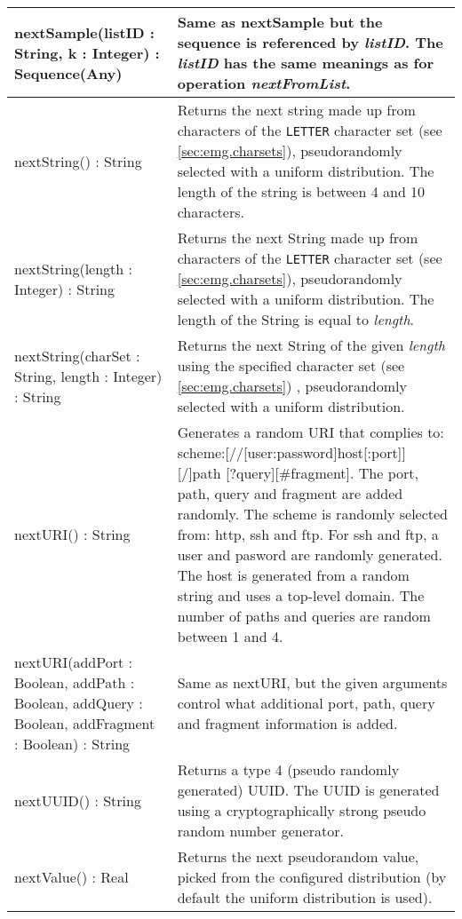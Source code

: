 \begin{longtabu} {|p{6.5cm}|X|}
	nextSample(listID : String, k : Integer) : Sequence(Any) & Same as nextSample but the sequence is referenced by \emph{listID}. The \emph{listID} has the same meanings as for operation \emph{nextFromList}.\\\hline
	
    nextString() : String &  Returns the next string made up from characters of the \texttt{LETTER} character set (see \ref{sec:emg.charsets}), pseudorandomly selected with a uniform distribution. The length of the string is between 4 and 10 characters.\\\hline
    
    nextString(length : Integer) : String &  Returns the next String made up from characters of the \texttt{LETTER} character set (see \ref{sec:emg.charsets}), pseudorandomly selected with a uniform distribution. The length of the String is equal to \emph{length}.\\\hline
    
	nextString(charSet : String, length : Integer) : String &  Returns the next  String of the given \emph{length} using the specified character set (see \ref{sec:emg.charsets}) , pseudorandomly selected with a uniform distribution.\\\hline
	
	nextURI() : String & Generates a random URI that complies to: scheme:[//[user:password\@]host[:port]][/]path [?query][\#fragment]. The port, path, query and fragment are added randomly. The scheme is randomly selected from:  http, ssh and ftp. For ssh and ftp, a user and pasword are randomly generated.  The host is generated from a random string and uses a top-level domain. The number of paths and queries are random between 1 and 4.\\\hline
	
	nextURI(addPort : Boolean, addPath : Boolean, addQuery : Boolean, addFragment : Boolean) : String & Same as nextURI, but the given arguments control what additional port, path, query and fragment information is added.\\\hline
    
    nextUUID() : String & Returns a type 4 (pseudo randomly generated) UUID. The UUID is generated using a cryptographically strong pseudo random number generator.\\\hline
	
	nextValue() : Real & Returns the next pseudorandom value, picked from the configured distribution (by default the uniform distribution is used).\\\hline
    

\end{longtabu}
